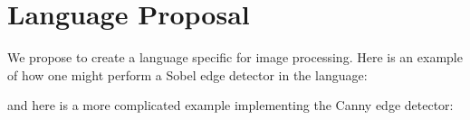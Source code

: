 \section{Language Proposal}


We propose to create a language specific for image processing.
Here is an example of how one might perform a Sobel edge detector
in the \sys{} language:

and here is a more complicated example implementing the Canny edge detector:
%

